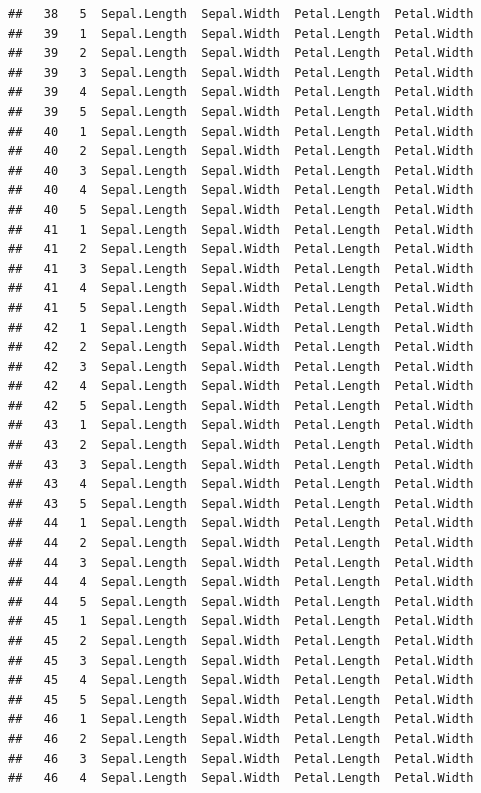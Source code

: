 \documentclass[
]{book}
\begin{document}
\begin{verbatim}
##   38   5  Sepal.Length  Sepal.Width  Petal.Length  Petal.Width
##   39   1  Sepal.Length  Sepal.Width  Petal.Length  Petal.Width
##   39   2  Sepal.Length  Sepal.Width  Petal.Length  Petal.Width
##   39   3  Sepal.Length  Sepal.Width  Petal.Length  Petal.Width
##   39   4  Sepal.Length  Sepal.Width  Petal.Length  Petal.Width
##   39   5  Sepal.Length  Sepal.Width  Petal.Length  Petal.Width
##   40   1  Sepal.Length  Sepal.Width  Petal.Length  Petal.Width
##   40   2  Sepal.Length  Sepal.Width  Petal.Length  Petal.Width
##   40   3  Sepal.Length  Sepal.Width  Petal.Length  Petal.Width
##   40   4  Sepal.Length  Sepal.Width  Petal.Length  Petal.Width
##   40   5  Sepal.Length  Sepal.Width  Petal.Length  Petal.Width
##   41   1  Sepal.Length  Sepal.Width  Petal.Length  Petal.Width
##   41   2  Sepal.Length  Sepal.Width  Petal.Length  Petal.Width
##   41   3  Sepal.Length  Sepal.Width  Petal.Length  Petal.Width
##   41   4  Sepal.Length  Sepal.Width  Petal.Length  Petal.Width
##   41   5  Sepal.Length  Sepal.Width  Petal.Length  Petal.Width
##   42   1  Sepal.Length  Sepal.Width  Petal.Length  Petal.Width
##   42   2  Sepal.Length  Sepal.Width  Petal.Length  Petal.Width
##   42   3  Sepal.Length  Sepal.Width  Petal.Length  Petal.Width
##   42   4  Sepal.Length  Sepal.Width  Petal.Length  Petal.Width
##   42   5  Sepal.Length  Sepal.Width  Petal.Length  Petal.Width
##   43   1  Sepal.Length  Sepal.Width  Petal.Length  Petal.Width
##   43   2  Sepal.Length  Sepal.Width  Petal.Length  Petal.Width
##   43   3  Sepal.Length  Sepal.Width  Petal.Length  Petal.Width
##   43   4  Sepal.Length  Sepal.Width  Petal.Length  Petal.Width
##   43   5  Sepal.Length  Sepal.Width  Petal.Length  Petal.Width
##   44   1  Sepal.Length  Sepal.Width  Petal.Length  Petal.Width
##   44   2  Sepal.Length  Sepal.Width  Petal.Length  Petal.Width
##   44   3  Sepal.Length  Sepal.Width  Petal.Length  Petal.Width
##   44   4  Sepal.Length  Sepal.Width  Petal.Length  Petal.Width
##   44   5  Sepal.Length  Sepal.Width  Petal.Length  Petal.Width
##   45   1  Sepal.Length  Sepal.Width  Petal.Length  Petal.Width
##   45   2  Sepal.Length  Sepal.Width  Petal.Length  Petal.Width
##   45   3  Sepal.Length  Sepal.Width  Petal.Length  Petal.Width
##   45   4  Sepal.Length  Sepal.Width  Petal.Length  Petal.Width
##   45   5  Sepal.Length  Sepal.Width  Petal.Length  Petal.Width
##   46   1  Sepal.Length  Sepal.Width  Petal.Length  Petal.Width
##   46   2  Sepal.Length  Sepal.Width  Petal.Length  Petal.Width
##   46   3  Sepal.Length  Sepal.Width  Petal.Length  Petal.Width
##   46   4  Sepal.Length  Sepal.Width  Petal.Length  Petal.Width

\end{verbatim}
\end{document}
